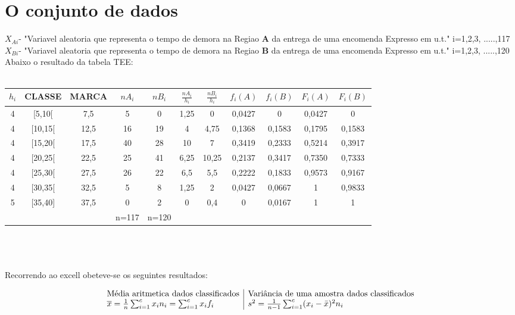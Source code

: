 \section{O conjunto de dados}\label{dados}
\noindent
$X_{Ai}$- "Variavel aleatoria que representa o tempo de demora na Regiao \textbf{A} da entrega de uma encomenda Expresso em u.t." \quad i=1,2,3, .....,117 \\
\qquad$X_{Bi}$- "Variavel aleatoria que representa o tempo de demora na Regiao \textbf{B} da entrega de uma encomenda Expresso em u.t." \quad i=1,2,3, .....,120 \\
Abaixo o resultado da tabela TEE:\\
\\
\begin{minipage}{0pt}
\begin{tabular}{ |c|c|c|c|c|c|c|c|c|c|c| }
\hline
$h_i$ & CLASSE & MARCA & $nA_i$ & $nB_i$ & $\frac{nA_i}{h_i}$	 & $\frac{nB_i}{h_i}$ & $f_i(A)$	& $f_i(B)$ & $F_i(A)$ & $F_i(B)$ \\
\hline
4 & [5,10[ & 7,5 & 5 & 0 & 1,25 & 0 & 0,0427 & 0 & 0,0427 & 0 \\
\hline
4 & [10,15[ & 12,5 & 16 & 19 & 4 & 4,75 & 0,1368 & 0,1583 & 0,1795 & 0,1583 \\
\hline
4 & [15,20[ & 17,5 & 40 & 28 & 10 & 7 & 0,3419 & 0,2333 & 0,5214 & 0,3917 \\
\hline
4 & [20,25[ & 22,5 & 25 & 41 & 6,25 & 10,25 & 0,2137 & 0,3417 & 0,7350 & 0,7333 \\
\hline
4 & [25,30[ & 27,5 & 26 & 22 & 6,5 & 5,5 & 0,2222 & 0,1833 & 0,9573 & 0,9167 \\
\hline
4 & [30,35[ & 32,5 & 5 & 8 & 1,25 & 2 & 0,0427 & 0,0667 & 1 & 0,9833 \\
\hline
5 & [35,40] & 37,5 & 0 & 2 & 0 & 0,4 & 0 & 0,0167 & 1 & 1 \\
\hline
& & & n=117 & n=120 & & & & & & \\
\hline
\end{tabular}
\end{minipage}
\\
\\
\\
Recorrendo ao excell obeteve-se os seguintes resultados: \\
\begin{minipage}{0pt}
$$\begin{array}{l | l}
\text{Média aritmetica dados classificados} & \text{Variância de uma amostra dados classificados} \\
\overline{x} = \frac{1}{n}\sum_{i=1}^cx_in_i = \sum_{i=1}^cx_if_i & s^2 = \frac{1}{n-1}\sum_{i=1}^c (x_i-\bar{x})^2 n_i
\end{array}$$
\end{minipage}
